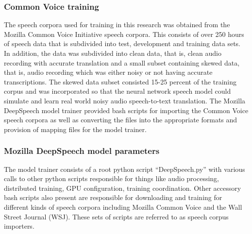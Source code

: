 \subsubsection{Common Voice training}
The speech corpora used for training in this research was obtained from the Mozilla Common Voice Initiative speech corpora.  This consists of over 250 hours of speech data that is subdivided into test, development and training data sets.  In addition, the data was subdivided into clean data, that is, clean audio recording with accurate translation and a small subset containing skewed data, that is, audio recording which was either noisy or not having accurate transcriptions.  The skewed data subset consisted 15-25 percent of the training corpus and was incorporated so that the neural network speech model could simulate and learn real world noisy audio speech-to-text translation.  The Mozilla DeepSpeech model trainer provided bash scripts for importing the Common Voice speech corpora as well as converting the files into the appropriate formats and provision of mapping files for the model trainer.
\subsubsection{Mozilla DeepSpeech model parameters}
The model trainer consists of a root python script “DeepSpeech.py” with various calls to other python scripts responsible for things like audio processing, distributed training, GPU configuration, training coordination.  Other accessory bash scripts also present are responsible for downloading and training for different kinds of speech corpora including Mozilla Common Voice and the Wall Street Journal (WSJ).  These sets of scripts are referred to as speech corpus importers. 

